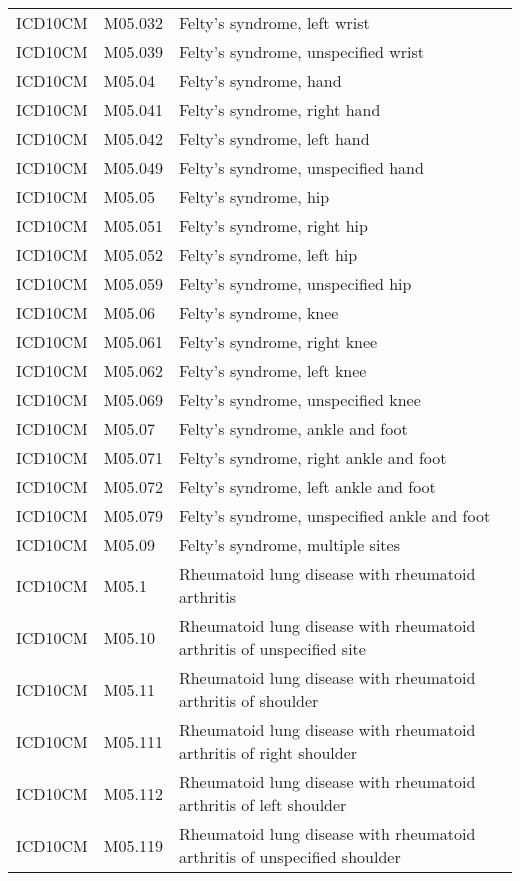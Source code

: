 \begin{table}[ht]
\begin{tabular}{lll}
  ICD10CM & M05.032 & Felty's syndrome, left wrist \\ 
  ICD10CM & M05.039 & Felty's syndrome, unspecified wrist \\ 
  ICD10CM & M05.04 & Felty's syndrome, hand \\ 
  ICD10CM & M05.041 & Felty's syndrome, right hand \\ 
  ICD10CM & M05.042 & Felty's syndrome, left hand \\ 
  ICD10CM & M05.049 & Felty's syndrome, unspecified hand \\ 
  ICD10CM & M05.05 & Felty's syndrome, hip \\ 
  ICD10CM & M05.051 & Felty's syndrome, right hip \\ 
  ICD10CM & M05.052 & Felty's syndrome, left hip \\ 
  ICD10CM & M05.059 & Felty's syndrome, unspecified hip \\ 
  ICD10CM & M05.06 & Felty's syndrome, knee \\ 
  ICD10CM & M05.061 & Felty's syndrome, right knee \\ 
  ICD10CM & M05.062 & Felty's syndrome, left knee \\ 
  ICD10CM & M05.069 & Felty's syndrome, unspecified knee \\ 
  ICD10CM & M05.07 & Felty's syndrome, ankle and foot \\ 
  ICD10CM & M05.071 & Felty's syndrome, right ankle and foot \\ 
  ICD10CM & M05.072 & Felty's syndrome, left ankle and foot \\ 
  ICD10CM & M05.079 & Felty's syndrome, unspecified ankle and foot \\ 
  ICD10CM & M05.09 & Felty's syndrome, multiple sites \\ 
  ICD10CM & M05.1 & Rheumatoid lung disease with rheumatoid arthritis \\ 
  ICD10CM & M05.10 & Rheumatoid lung disease with rheumatoid arthritis of unspecified site \\ 
  ICD10CM & M05.11 & Rheumatoid lung disease with rheumatoid arthritis of shoulder \\ 
  ICD10CM & M05.111 & Rheumatoid lung disease with rheumatoid arthritis of right shoulder \\ 
  ICD10CM & M05.112 & Rheumatoid lung disease with rheumatoid arthritis of left shoulder \\ 
  ICD10CM & M05.119 & Rheumatoid lung disease with rheumatoid arthritis of unspecified shoulder \\ 

\end{tabular}
\end{table}
